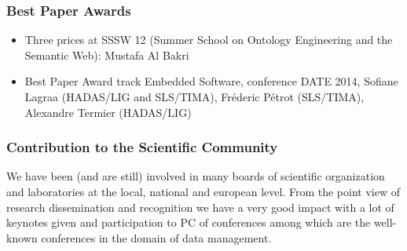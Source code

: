 
\subsubsection*{Best Paper Awards}
\begin{itemize}

\item Three prices at SSSW 12 (Summer School on Ontology Engineering and the Semantic Web): Mustafa Al Bakri  

\item Best Paper Award track Embedded Software, conference DATE 2014, Sofiane Lagraa (HADAS/LIG and SLS/TIMA), Fr{\'e}deric P{\'e}trot (SLS/TIMA), Alexandre Termier (HADAS/LIG)

\end{itemize}




\subsubsection{Contribution to the Scientific Community}

We have been (and are still) involved in many boards of scientific organization and laboratories at the local, national and european level. From the point view of research dissemination and recognition we have a very good impact with a lot of keynotes  given and participation to PC of conferences among which are the well-known conferences in the domain of data management.
 
